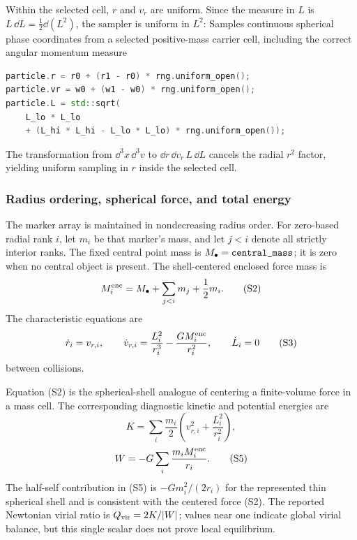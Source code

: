 Within the selected cell, \(r\) and \(v_r\) are uniform.  Since the measure in
\(L\) is \(L\,\dd L=\tfrac12\dd(L^2)\), the sampler is uniform in \(L^2\):
{}
{Samples continuous spherical phase coordinates from a selected positive-mass
 carrier cell, including the correct angular momentum measure}
\begin{lstlisting}[language=C++]
particle.r = r0 + (r1 - r0) * rng.uniform_open();
particle.vr = w0 + (w1 - w0) * rng.uniform_open();
particle.L = std::sqrt(
    L_lo * L_lo
    + (L_hi * L_hi - L_lo * L_lo) * rng.uniform_open());
\end{lstlisting}
The transformation from \(\dd^3x\,\dd^3v\) to
\(\dd r\,\dd v_r\,L\,\dd L\) cancels the radial \(r^2\) factor, yielding
uniform sampling in \(r\) inside the selected cell.

\subsubsection{Radius ordering, spherical force, and total energy}

The marker array is maintained in nondecreasing radius order.  For zero-based
radial rank \(i\), let \(m_i\) be that marker's mass, and let \(j<i\) denote
all strictly interior ranks.  The fixed central point mass is
\(M_\bullet=\code{central_mass}\); it is zero when no central object is
present.  The shell-centered enclosed force mass is
\[
 M_i^{\rm enc}=M_\bullet+\sum_{j<i}m_j+\frac12m_i.         \tag{S2}
\]
The characteristic equations are
\[
 \dot r_i=v_{r,i},\qquad
 \dot v_{r,i}=\frac{L_i^2}{r_i^3}
              -\frac{GM_i^{\rm enc}}{r_i^2},
 \qquad \dot L_i=0                                         \tag{S3}
\]
between collisions.

Equation (S2) is the spherical-shell analogue of centering a finite-volume
force in a mass cell.  The corresponding diagnostic kinetic and potential
energies are
\[
 K=\sum_i\frac{m_i}{2}
 \left(v_{r,i}^2+\frac{L_i^2}{r_i^2}\right),               \tag{S4}
\]
\[
 W=-G\sum_i\frac{m_iM_i^{\rm enc}}{r_i}.                  \tag{S5}
\]
The half-self contribution in (S5) is
\(-Gm_i^2/(2r_i)\) for the represented thin spherical shell and is consistent
with the centered force (S2).  The reported Newtonian virial ratio is
\(Q_{\rm vir}=2K/|W|\); values near one indicate global virial balance, but
this single scalar does not prove local equilibrium.

